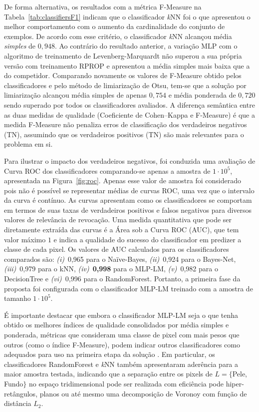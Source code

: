 De forma alternativa, os resultados com a métrica F-Measure na Tabela~\ref{tab:classifiersF1} indicam que o classificador \textit{k}NN foi o que apresentou o melhor comportamento com o aumento da cardinalidade do conjunto de exemplos.
De acordo com esse critério, o classificador \textit{k}NN alcançou média \textit{simples} de $0,948$.
Ao contrário do resultado anterior, a variação MLP com o algoritmo de treinamento de Levenberg-Marquardt não superou a sua própria versão com treinamento RPROP e apresentou a média simples mais baixa que a do competidor.
Comparando novamente os valores de F-Measure obtido pelos classificadores e pelo método de limiarização de Otsu, tem-se que a solução por limiarização alcançou média simples de apenas $0,754$ e média ponderada de $0,720$ sendo superado por todos os classificadores avaliados.
A diferença semântica entre as duas medidas de qualidade (Coeficiente de Cohen--Kappa e F-Measure) é que a medida F-Measure não penaliza erros de classificação dos verdadeiros negativos (TN), assumindo que os verdadeiros positivos (TN) são mais relevantes para o problema em si. 

Para ilustrar o impacto dos verdadeiros negativos, foi conduzida uma avaliação de Curva ROC dos classificadores comparando-se apenas a amostra de $1 \cdot 10^5$, apresentada na Figura~\ref{fig:roc}.
Apenas esse valor de amostra foi considerado pois não é possível se representar médias de curvas ROC, uma vez que o intervalo da curva é contínuo.
As curvas apresentam como os classificadores se comportam em termos de suas taxas de verdadeiros positivos e falsos negativos para diversos valores de relevância de revocação.
Uma medida quantitativa que pode ser diretamente extraída das curvas é a Área sob a Curva ROC (AUC), que tem valor máximo $1$ e indica a qualidade do sucesso do classificador em predizer a classe de cada pixel.
Os valores de AUC calculados para os classificadores comparados são:
\textit{(i)}~0,965 para o Na\"ive-Bayes,
\textit{(ii)}~0,924 para o Bayes-Net,
\textit{(iii)}~0,979 para o kNN,
\textit{(iv)}~\textbf{0,998} para o MLP-LM,
\textit{(v)}~0,982 para o DecisionTree e
\textit{(vi)}~0,996 para o RandomForest.
Portanto, a primeira fase da proposta \system foi configurada com o classificador MLP-LM treinado com a amostra de tamanho $1 \cdot 10^5$.

É importante destacar que embora o classificador MLP-LM seja o que tenha obtido os melhores índices de qualidade consolidados por média simples e ponderada, métricas que consideram uma classe de pixel com mais pesos que outros (como o índice F-Measure), podem indicar outros classificadores como adequados para uso na primeira etapa da solução \system.
Em particular, os classificadores RandomForest e \textit{k}NN também apresentaram aderência para a maior amostra testada, indicando que a separação entre os pixels de $L=\{$Pele, Fundo$\}$ no espaço tridimensional pode ser realizada com eficiência pode hiper-retângulos, planos ou até mesmo uma decomposição de Voronoy com função de distância $L_2$.

